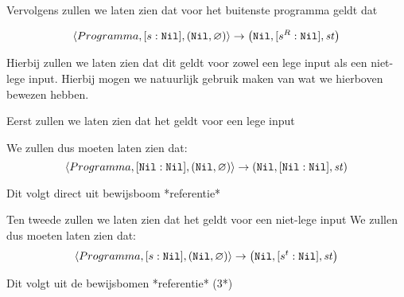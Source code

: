Vervolgens zullen we laten zien dat voor het buitenste programma geldt dat 

$$
\left\langle Programma,[s:\texttt{Nil}],(\texttt{Nil},\varnothing)\right\rangle\to\left(\texttt{Nil},[s^R:\texttt{Nil}],\mathit{st}\right)
$$

Hierbij zullen we laten zien dat dit geldt voor zowel een lege input als een niet-lege input. 
Hierbij mogen we natuurlijk gebruik maken van wat we hierboven bewezen hebben. 
\medskip

Eerst zullen we laten zien dat het geldt voor een lege input 

We zullen dus moeten laten zien dat:
$$
\left\langle Programma,[\texttt{Nil}:\texttt{Nil}],(\texttt{Nil},\varnothing)\right\rangle\to\left(\texttt{Nil},[\texttt{Nil}:\texttt{Nil}],\mathit{st}\right)
$$

Dit volgt direct uit bewijsboom *referentie* 


Ten tweede zullen we laten zien dat het geldt voor een niet-lege input 
We zullen dus moeten laten zien dat:
$$
\left\langle Programma,[s:\texttt{Nil}],(\texttt{Nil},\varnothing)\right\rangle\to\left(\texttt{Nil},[s^t:\texttt{Nil}],\mathit{st}\right)
$$

Dit volgt uit de bewijsbomen *referentie* (3*) 





